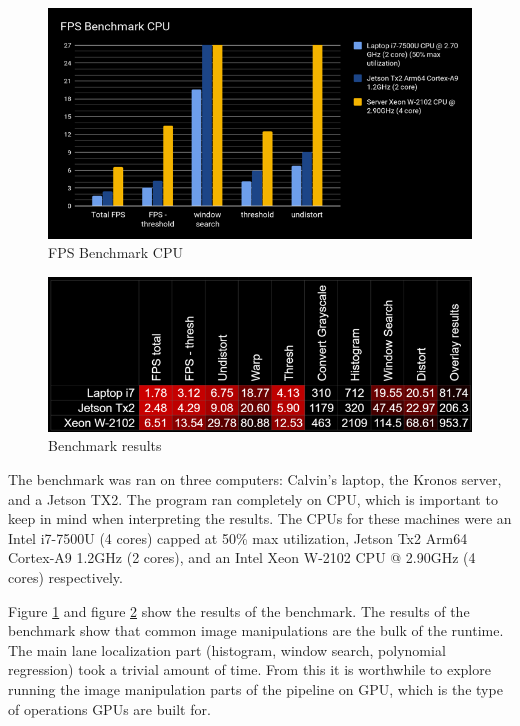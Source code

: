 \documentclass[twoside,twocolumn]{article}
\begin{document}
\begin{figure}
  \includegraphics[width=\linewidth]{calvin1.png}
  \caption{FPS Benchmark CPU}
  \label{fig:cpu}
\end{figure}

\begin{figure}
  \includegraphics[width=\linewidth]{calvin2.png}
  \caption{Benchmark results}
  \label{fig:benchmark}
\end{figure}

\par The benchmark was ran on three computers: Calvin's laptop, the Kronos server, and a Jetson TX2. The program ran completely on CPU, which is important to keep in mind when interpreting the results. The CPUs for these machines were an Intel i7-7500U (4 cores) capped at 50\% max utilization, Jetson Tx2 Arm64 Cortex-A9 1.2GHz (2 cores), and an Intel Xeon W-2102 CPU @ 2.90GHz (4 cores) respectively.

\par Figure \ref{fig:cpu} and figure \ref{fig:benchmark} show the results of the benchmark. The results of the benchmark show that common image manipulations are the bulk of the runtime. The main lane localization part (histogram, window search, polynomial regression) took a trivial amount of time. From this it is worthwhile to explore running the image manipulation parts of the pipeline on GPU, which is the type of operations GPUs are built for.
\end{document}
